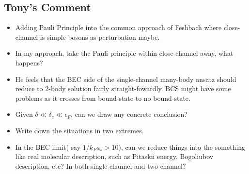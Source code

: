 \subsection{Tony's Comment}
\begin{itemize}
\item Adding Pauli Principle into the common approach of Feshbach where close-channel is simple bosons as perturbation maybe.  
\item In my approach, take the Pauli principle within close-channel away, what happens?
\item  He feels that the BEC side of the single-channel many-body ansatz should reduce to 2-body solution fairly straight-fowardly.  BCS might have some problems as it crosses from bound-state to no bound-state.  
\item  Given $\delta\ll\delta_{c}\ll\epsilon_{F}$, can we draw any concrete conclusion?
\item Write down the situations in two extremes.  
\item In the BEC limit( say $1/k_{F}a_{s}>10$), can we reduce things into the something like real molecular description, such as Pitaskii energy, Bogoliubov description, etc?  In both single channel and two-channel? 
\end{itemize}
